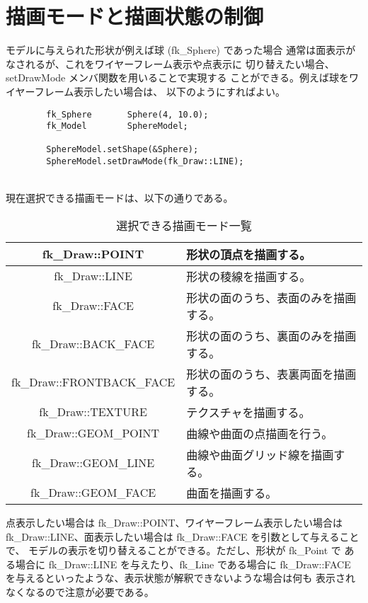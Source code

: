 \section{描画モードと描画状態の制御} \label{sec:drawmode}
モデルに与えられた形状が例えば球 (fk\_Sphere) であった場合
通常は面表示がなされるが、これをワイヤーフレーム表示や点表示に
切り替えたい場合、setDrawMode メンバ関数を用いることで実現する
ことができる。例えば球をワイヤーフレーム表示したい場合は、
以下のようにすればよい。
\\
\begin{breakbox}
\begin{verbatim}
        fk_Sphere       Sphere(4, 10.0);
        fk_Model        SphereModel;

        SphereModel.setShape(&Sphere);
        SphereModel.setDrawMode(fk_Draw::LINE);
\end{verbatim}
\end{breakbox}
~ \\
現在選択できる描画モードは、以下の通りである。
\begin{table}[H]
\caption{選択できる描画モード一覧}
\label{tbl:drawmode}
\begin{center}
\begin{tabular}{|c|l|}
\hline
fk\_Draw::POINT & 形状の頂点を描画する。\\ \hline
fk\_Draw::LINE & 形状の稜線を描画する。\\ \hline
fk\_Draw::FACE & 形状の面のうち、表面のみを描画する。\\ \hline
fk\_Draw::BACK\_FACE & 形状の面のうち、裏面のみを描画する。\\ \hline
fk\_Draw::FRONTBACK\_FACE & 形状の面のうち、表裏両面を描画する。\\ \hline
fk\_Draw::TEXTURE & テクスチャを描画する。\\ \hline
fk\_Draw::GEOM\_POINT & 曲線や曲面の点描画を行う。\\ \hline
fk\_Draw::GEOM\_LINE & 曲線や曲面グリッド線を描画する。\\ \hline
fk\_Draw::GEOM\_FACE & 曲面を描画する。\\ \hline
\end{tabular}
\end{center}
\end{table}

点表示したい場合は fk\_Draw::POINT、ワイヤーフレーム表示したい場合は
fk\_Draw::LINE、面表示したい場合は fk\_Draw::FACE を引数として与えることで、
モデルの表示を切り替えることができる。ただし、形状が fk\_Point で
ある場合に fk\_Draw::LINE を与えたり、fk\_Line である場合に fk\_Draw::FACE
を与えるといったような、表示状態が解釈できないような場合は何も
表示されなくなるので注意が必要である。

